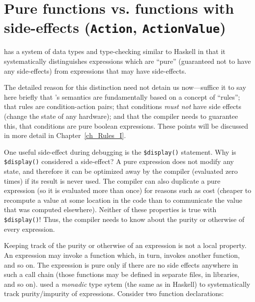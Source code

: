 \section{Pure functions vs. functions with side-effects ({\tt Action}, {\tt ActionValue})}

\label{Sec_Pure_vs_Side_Effect_functions}


{\BSV} has a system of data types and type-checking similar to Haskell in
that it systematically distinguishes expressions which are ``pure''
(guaranteed not to have any side-effects) from expressions that may
have side-effects.

The detailed reason for this distinction need not detain us
now---suffice it to say here briefly that {\BSV}'s semantics are
fundamentally based on a concept of ``rules''; that rules are
condition-action pairs; that conditions \emph{must not} have side
effects (change the state of any hardware); and that the compiler
needs to guarantee this, {\ie} that conditions are pure boolean
expressions.  These points will be discussed in more detail in
Chapter~\ref{ch_Rules_I}.

One useful side-effect during debugging is the {\tt \$display()}
statement.  Why is {\tt \$display()} considered a side-effect?  A pure
expression does not modify any state, and therefore it can be
optimized away by the compiler (evaluated zero times) if its result is
never used.  The compiler can also duplicate a pure expression (so it
is evaluated more than once) for reasons such as cost (cheaper to
recompute a value at some location in the code than to communicate the
value that was computed elsewhere).  Neither of these properties is
true with {\tt \$display()}!  Thus, the compiler needs to know about
the purity or otherwise of every expression.

Keeping track of the purity or otherwise of an expression is not a
local property.  An expression may invoke a function which, in turn,
invokes another function, and so on.  The expression is pure only if
there are no side effects anywhere in such a call chain (those
functions may be defined in separate files, in libraries, and so on).
{\BSV} used a \emph{monadic} type sytem (the same as in Haskell) to
systematically track purity/impurity of expressions.  Consider two
function declarations:

